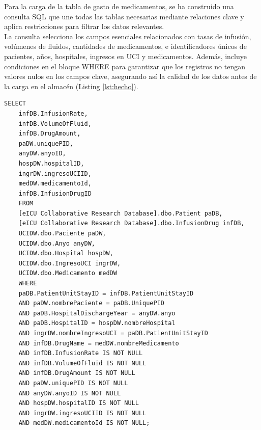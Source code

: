 \documentclass{article}
\begin{document}
	
	Para la carga de la tabla de gasto de medicamentos, se ha construido una consulta SQL que une todas las tablas necesarias mediante relaciones clave y aplica restricciones para filtrar los datos relevantes.
	\\
	
	La consulta selecciona los campos esenciales relacionados con tasas de infusión, volúmenes de fluidos, cantidades de medicamentos, e identificadores únicos de pacientes, años, hospitales, ingresos en UCI y medicamentos. Además, incluye condiciones en el bloque WHERE para garantizar que los registros no tengan valores nulos en los campos clave, asegurando así la calidad de los datos antes de la carga en el almacén (Listing \ref{lst:hecho}).
	\begin{lstlisting}[style=ddlstyle, label=lst:hecho,caption=Consulta para llenado de hecho]
	SELECT 
	infDB.InfusionRate, 
	infDB.VolumeOfFluid, 
	infDB.DrugAmount, 
	paDW.uniquePID, 
	anyDW.anyoID, 
	hospDW.hospitalID, 
	ingrDW.ingresoUCIID, 
	medDW.medicamentoId,
	infDB.InfusionDrugID 
	FROM 
	[eICU Collaborative Research Database].dbo.Patient paDB,
	[eICU Collaborative Research Database].dbo.InfusionDrug infDB,
	UCIDW.dbo.Paciente paDW,
	UCIDW.dbo.Anyo anyDW,
	UCIDW.dbo.Hospital hospDW,
	UCIDW.dbo.IngresoUCI ingrDW,
	UCIDW.dbo.Medicamento medDW
	WHERE 
	paDB.PatientUnitStayID = infDB.PatientUnitStayID 
	AND paDW.nombrePaciente = paDB.UniquePID 
	AND paDB.HospitalDischargeYear = anyDW.anyo 
	AND paDB.HospitalID = hospDW.nombreHospital 
	AND ingrDW.nombreIngresoUCI = paDB.PatientUnitStayID 
	AND infDB.DrugName = medDW.nombreMedicamento 
	AND infDB.InfusionRate IS NOT NULL
	AND infDB.VolumeOfFluid IS NOT NULL
	AND infDB.DrugAmount IS NOT NULL
	AND paDW.uniquePID IS NOT NULL
	AND anyDW.anyoID IS NOT NULL
	AND hospDW.hospitalID IS NOT NULL
	AND ingrDW.ingresoUCIID IS NOT NULL
	AND medDW.medicamentoId IS NOT NULL;
	\end{lstlisting}
	
	
	
\end{document}
